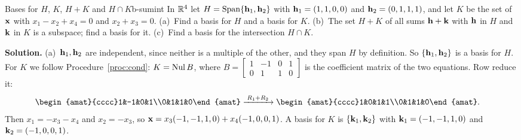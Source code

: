 \documentclass[11pt]{article}
\begin{document}
\begin{exmp}{Bases for $H$, $K$, $H+K$ and $H\cap K$}{b-sumint}
In $\mathbb{R}^4$ let $H=\operatorname{Span}\{\mathbf{h}_1,\mathbf{h}_2\}$ with $\mathbf{h}_1=(1,1,0,0)$ and $\mathbf{h}_2=(0,1,1,1)$, and let $K$ be the set of $\mathbf{x}$ with $x_1-x_2+x_4=0$ and $x_2+x_3=0$. (a)~Find a basis for $H$ and a basis for $K$. (b)~The set $H+K$ of all sums $\mathbf{h}+\mathbf{k}$ with $\mathbf{h}$ in $H$ and $\mathbf{k}$ in $K$ is a subspace; find a basis for it. (c)~Find a basis for the intersection $H\cap K$.

\textbf{Solution.} (a)~$\mathbf{h}_1,\mathbf{h}_2$ are independent, since neither is a multiple of the other, and they span $H$ by definition. So $\{\mathbf{h}_1,\mathbf{h}_2\}$ is a basis for $H$. For $K$ we follow Procedure~\ref{proc:cond}: $K=\operatorname{Nul} B$, where $B=\begin{bmatrix}1&-1&0&1\\0&1&1&0\end{bmatrix}$ is the coefficient matrix of the two equations. Row reduce it:
\begin{align*}
\begin{amat}{cccc}1&-1&0&1\\0&1&1&0\end{amat}
&\rops{R_1+R_2}
\begin{amat}{cccc}1&0&1&1\\0&1&1&0\end{amat}.
\end{align*}
Then $x_1=-x_3-x_4$ and $x_2=-x_3$, so $\mathbf{x}=x_3(-1,-1,1,0)+x_4(-1,0,0,1)$. A basis for $K$ is $\{\mathbf{k}_1,\mathbf{k}_2\}$ with $\mathbf{k}_1=(-1,-1,1,0)$ and $\mathbf{k}_2=(-1,0,0,1)$.


\end{exmp}
\end{document}
